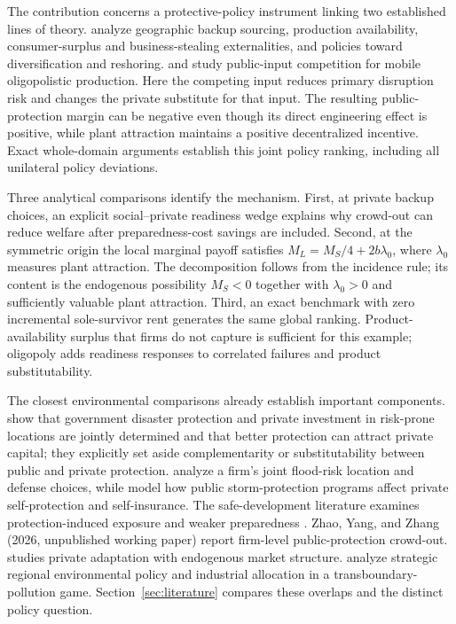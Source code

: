 The contribution concerns a protective-policy instrument linking two established lines of theory. \citet{GrossmanHelpmanLhuillier2023} analyze geographic backup sourcing, production availability, consumer-surplus and business-stealing externalities, and policies toward diversification and reshoring. \citet{WalzWellisch1996} and \citet{MaurerWalz2000} study public-input competition for mobile oligopolistic production. Here the competing input reduces primary disruption risk and changes the private substitute for that input. The resulting public-protection margin can be negative even though its direct engineering effect is positive, while plant attraction maintains a positive decentralized incentive. Exact whole-domain arguments establish this joint policy ranking, including all unilateral policy deviations.

Three analytical comparisons identify the mechanism. First, at private backup choices, an explicit social--private readiness wedge explains why crowd-out can reduce welfare after preparedness-cost savings are included. Second, at the symmetric origin the local marginal payoff satisfies $M_L=M_S/4+2b\lambda_0$, where $\lambda_0$ measures plant attraction. The decomposition follows from the incidence rule; its content is the endogenous possibility $M_S<0$ together with $\lambda_0>0$ and sufficiently valuable plant attraction. Third, an exact benchmark with zero incremental sole-survivor rent generates the same global ranking. Product-availability surplus that firms do not capture is sufficient for this example; oligopoly adds readiness responses to correlated failures and product substitutability.

The closest environmental comparisons already establish important components. \citet{KouskyLuttmerZeckhauser2006} show that government disaster protection and private investment in risk-prone locations are jointly determined and that better protection can attract private capital; they explicitly set aside complementarity or substitutability between public and private protection. \citet{GramesEtAl2019} analyze a firm's joint flood-risk location and defense choices, while \citet{MahmudBarbier2016} model how public storm-protection programs affect private self-protection and self-insurance. The safe-development literature examines protection-induced exposure and weaker preparedness \citep{HaerEtAl2020,FusinatoEtAl2024}. Zhao, Yang, and Zhang (2026, unpublished working paper) report firm-level public-protection crowd-out. \citet{Eisenack2014} studies private adaptation with endogenous market structure. \citet{MartinHerranEtAl2026} analyze strategic regional environmental policy and industrial allocation in a transboundary-pollution game. Section~\ref{sec:literature} compares these overlaps and the distinct policy question.

